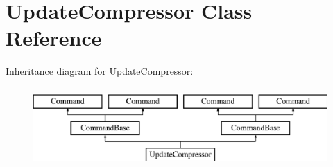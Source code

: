\hypertarget{class_update_compressor}{}\section{Update\+Compressor Class Reference}
\label{class_update_compressor}
Inheritance diagram for Update\+Compressor\+:\begin{figure}[H]
\begin{center}
\leavevmode
\includegraphics[height=3.000000cm]{class_update_compressor}
\end{center}
\end{figure}

